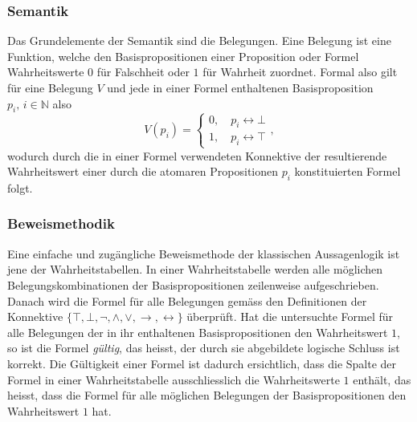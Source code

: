 \documentclass[a4paper,11pt]{article}
\numberwithin{equation}{section}
\begin{document}
\subsubsection{Semantik}
Das Grundelemente der Semantik sind die Belegungen. Eine Belegung ist eine Funktion, welche den Basispropositionen einer Proposition oder Formel Wahrheitswerte $0$ für Falschheit oder $1$ für Wahrheit zuordnet. Formal also gilt für eine Belegung $V$ und jede in einer Formel enthaltenen Basisproposition $p_i,\, i \in \mathbb{N}$ also $$V(p_i) = \begin{cases}
0, \quad p_i \leftrightarrow \bot \\
1, \quad p_i \leftrightarrow \top
\end{cases},$$ wodurch durch die in einer Formel verwendeten Konnektive der resultierende Wahrheitswert einer durch die atomaren Propositionen $p_i$ konstituierten Formel folgt.

\subsubsection{Beweismethodik}
Eine einfache und zugängliche Beweismethode der klassischen Aussagenlogik ist jene der Wahrheitstabellen. In einer Wahrheitstabelle werden alle möglichen Belegungskombinationen der Basispropositionen zeilenweise aufgeschrieben. Danach wird die Formel für alle Belegungen gemäss den Definitionen der Konnektive $\{\top,\bot,\neg,\land,\lor,\rightarrow,\leftrightarrow\}$ überprüft. Hat die untersuchte Formel für alle Belegungen der in ihr enthaltenen Basispropositionen den Wahrheitswert $1$, so ist die Formel \textit{gültig}, das heisst, der durch sie abgebildete logische Schluss ist korrekt. Die Gültigkeit einer Formel ist dadurch ersichtlich, dass die Spalte der Formel in einer Wahrheitstabelle ausschliesslich die Wahrheitswerte $1$ enthält, das heisst, dass die Formel für alle möglichen Belegungen der Basispropositionen den Wahrheitswert $1$ hat.
\end{document}
